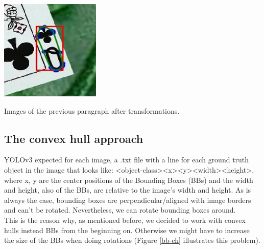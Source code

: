 \documentclass[a4paper]{article}
\begin{document}
\begin{minipage}{\columnwidth}
{\includegraphics[scale=0.615]{images/qc_4}}  
\qquad
{}  
\qquad
\caption{Images of the previous paragraph after transformations.}
\label{img-cards examples}
\end{minipage}

\subsection{The convex hull approach}
YOLOv3 expected for each image, a .txt file with a line for each ground truth object in the image that looks like:
<object-class><x><y><width><height>, where x, y are the center positions of the Bounding Boxes (BBs) and the width and height, also of the BBs, are relative to the image's width and height.  
As is always the case, bounding boxes are perpendicular/aligned with image borders and can't be rotated. Nevertheless, we can rotate bounding boxes around. \\
This is the reason why, as mentioned before, we decided to work with convex hulls instead BBs from the beginning on.  Otherwise we might have to increase the size of the BBs when doing rotations (Figure \ref{bb-ch} illustrates this problem). 
\end{document}
